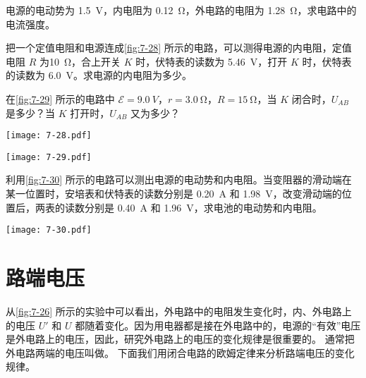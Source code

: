 \begin{Practice}
\begin{question}
    \item 电源的电动势为 \qty{1.5}{V}，内电阻为 \qty{0.12}{\ohm}，外电路的电阻为 \qty{1.28}{\ohm}，求电路中的电流强度。
    \item 把一个定值电阻和电源连成\cref{fig:7-28} 所示的电路，可以测得电源的内电阻，定值电阻 $R$ 为\qty{10}{\ohm}，合上开关 $K$ 时，伏特表的读数为 \qty{5.46}{V}，打开 $K$ 时，伏特表的读数为 \qty{6.0}{V}。求电源的内电阻为多少。
    \item 在\cref{fig:7-29} 所示的电路中 $\mathcal{E}=\qty{9.0}{V}$，$r=\qty{3.0}{\ohm}$，$R=\qty{15}{\ohm}$，当 $K$ 闭合时，$U_{AB}$ 是多少？当 $K$ 打开时，$U_{AB}$ 又为多少？
    \begin{figurehere}
      \begin{minipage}[b]{0.48\linewidth}\centering
        \texttt{[image: 7-28.pdf]}
        \caption{}\label{fig:7-28}
      \end{minipage}
      \begin{minipage}[b]{0.48\linewidth}\centering
        \texttt{[image: 7-29.pdf]}
        \caption{}\label{fig:7-29}
      \end{minipage}
    \end{figurehere}    
    \item 利用\cref{fig:7-30} 所示的电路可以测出电源的电动势和内电阻。当变阻器的滑动端在某一位置时，安培表和伏特表的读数分别是 \qty{0.20}{A} 和 \qty{1.98}{V}，改变滑动端的位置后，两表的读数分别是 \qty{0.40}{A} 和 \qty{1.96}{V}，求电池的电动势和内电阻。
  \begin{figurehere}
    \begin{minipage}{\linewidth}\centering
      \texttt{[image: 7-30.pdf]}
      \caption{}\label{fig:7-30}
    \end{minipage}
  \end{figurehere}    
\end{question}
\end{Practice}


\section{路端电压}
从\cref{fig:7-26} 所示的实验中可以看出，外电路中的电阻发生变化时，内、外电路上的电压 $U'$ 和 $U$ 都随着变化。因为用电器都是接在外电路中的，电源的“有效”电压是外电路上的电压，因此，研究外电路上的电压的变化规律是很重要的。
通常把外电路两端的电压叫做。
下面我们用闭合电路的欧姆定律来分析路端电压的变化规律。

